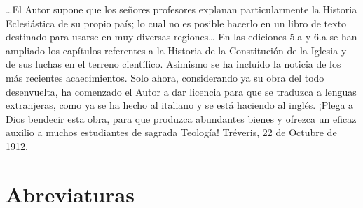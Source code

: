 \raggedbottom{} \documentclass[12pt, a4paper, openany]{book} %
\begin{document}
\ldots El Autor supone que los señores profesores explanan particularmente la Historia Eclesiástica de su propio país; lo cual no es posible hacerlo en un libro de texto destinado para usarse en muy diversas regiones\ldots
En las ediciones 5.a y 6.a se han ampliado los capítulos referentes a la Historia de la Constitución de la Iglesia y de sus luchas en el terreno científico. Asimismo se ha incluído la noticia de los más recientes acaecimientos.
Solo ahora, considerando ya su obra del todo desenvuelta, ha comenzado el Autor a dar licencia para que se traduzca a lenguas extranjeras, como ya se ha hecho al italiano y se está haciendo al inglés. ¡Plega a Dios bendecir esta obra, para que produzca abundantes bienes y ofrezca un eficaz auxilio a muchos estudiantes de sagrada Teología!
Tréveris, 22 de Octubre de 1912.
\section{Abreviaturas}
\end{document}
